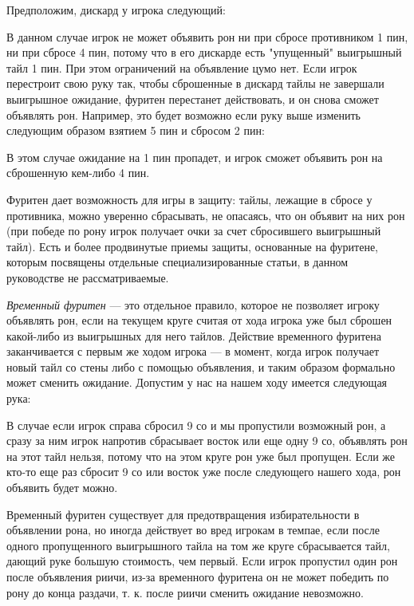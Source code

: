 Предположим, дискард у игрока следующий:


В данном случае игрок не может объявить рон ни при сбросе противником 1 пин, ни при сбросе 4 пин, потому что в его дискарде есть "упущенный" выигрышный тайл 1 пин. При этом ограничений на объявление цумо нет. Если игрок перестроит свою руку так, чтобы сброшенные в дискард тайлы не завершали выигрышное ожидание, фуритен перестанет действовать, и он снова сможет объявлять рон. Например, это будет возможно если руку выше изменить следующим образом взятием 5 пин и сбросом 2 пин: 


В этом случае ожидание на 1 пин пропадет, и игрок сможет объявить рон на сброшенную кем-либо 4 пин. 

Фуритен дает возможность для игры в защиту: тайлы, лежащие в сбросе у противника, можно уверенно сбрасывать, не опасаясь, что он объявит на них рон (при победе по рону игрок получает очки за счет сбросившего выигрышный тайл). Есть и более продвинутые приемы защиты, основанные на фуритене, которым посвящены отдельные специализированные статьи, в данном руководстве не рассматриваемые.

\textit{Временный фуритен} --- это отдельное правило, которое не позволяет игроку объявлять рон, если на текущем круге считая от хода игрока уже был сброшен какой-либо из выигрышных для него тайлов. Действие временного фуритена заканчивается с первым же ходом игрока --- в момент, когда игрок получает новый тайл со стены либо с помощью объявления, и таким образом формально может сменить ожидание. Допустим у нас на нашем ходу имеется следующая рука:


В случае если игрок справа сбросил 9 со и мы пропустили возможный рон, а сразу за ним игрок напротив сбрасывает восток или еще одну 9 со, объявлять рон на этот тайл нельзя, потому что на этом круге рон уже был пропущен. Если же кто-то еще раз сбросит 9 со или восток уже после следующего нашего хода, рон объявить будет можно.

Временный фуритен существует для предотвращения избирательности в объявлении рона, но иногда действует во вред игрокам в темпае, если после одного пропущенного выигрышного тайла на том же круге сбрасывается тайл, дающий руке большую стоимость, чем первый. Если игрок пропустил один рон после объявления риичи, из-за временного фуритена он не может победить по рону до конца раздачи, т. к. после риичи сменить ожидание невозможно.


